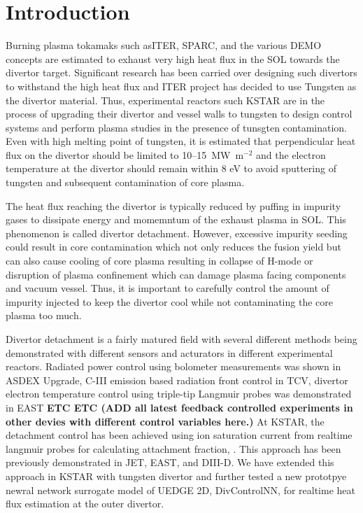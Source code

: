 
\section{Introduction}
\label{sec:introduction}

Burning plasma tokamaks such asITER\cite{Holtkamp_2007_FED}, SPARC\cite{Creely_2020_JPP}, and the various DEMO concepts are estimated to exhaust very high heat flux in the \ac{SOL} towards the divertor target. Significant research has been carried over designing such divertors to withstand the high heat flux and ITER project has decided to use Tungsten as the divertor material. Thus, experimental reactors such KSTAR are in the process of upgrading their divertor and vessel walls to tungsten to design control systems and perform plasma studies in the presence of tunsgten contamination. Even with high melting point of tungsten, it is estimated that perpendicular heat flux on the divertor should be limited to 10--15~MW~$\mathrm{m}^{-2}$\cite{pitts_2019_nme} and the electron temperature at the divertor should remain within 8 eV\cite{Brezinsek_2019_NF} to avoid sputtering of tungsten and subsequent contamination of core plasma.

The heat flux reaching the divertor is typically reduced by puffing in impurity gases to dissipate energy and momemntum of the exhaust plasma in \ac{SOL}. This phenomenon is called divertor detachment. However, excessive impurity seeding could result in core contamination which not only reduces the fusion yield but can also cause cooling of core plasma resulting in collapse of H-mode or disruption of plasma confinement which can damage plasma facing components and vacuum vessel. Thus, it is important to carefully control the amount of impurity injected to keep the divertor cool while not contaminating the core plasma too much.

Divertor detachment is a fairly matured field with several different methods being demonstrated with different sensors and acturators in different experimental reactors. Radiated power control using bolometer measurements was shown in ASDEX Upgrade\cite{Kallenbach_2012_NF}, C-III emission based radiation front control in TCV\cite{Ravensbergen_2021_NC}, divertor electron temperature control using triple-tip Langmuir probes was demonstrated in EAST\cite{Eldon_2021_NME} \textbf{ETC ETC (ADD all latest feedback controlled experiments in other devies  with different control variables here.)} At KSTAR, the detachment control has been achieved using ion saturation current from realtime langmuir probes for calculating attachment fraction, \Afrac \cite{Eldon_2022_PPCF}. This approach has been previously demonstrated in JET\cite{Guillemaut_2017_PPCF}, EAST\cite{Yuan_2020_FED}, and DIII-D\cite{Eldon_2021_NME}. We have extended this approach in KSTAR with tungsten divertor and further tested a new prototpye newral network surrogate model of UEDGE 2D, DivControlNN\cite{Zhu_2025_InPrep}, for realtime heat flux estimation at the outer divertor.

